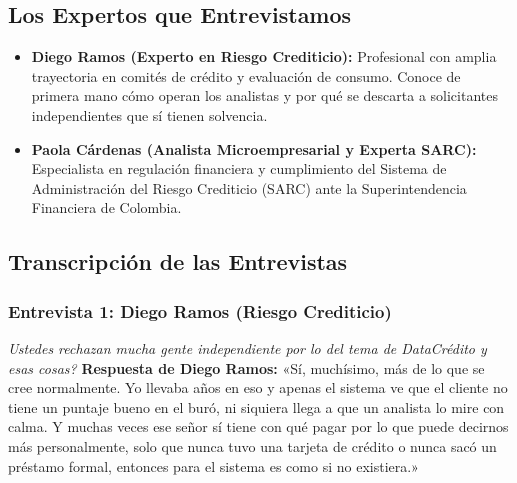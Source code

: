 \documentclass[11pt,a4paper]{article}
\begin{document}
\subsection{Los Expertos que Entrevistamos}
\begin{itemize}[leftmargin=*]
    \item \textbf{Diego Ramos (Experto en Riesgo Crediticio):} Profesional con amplia trayectoria en comit\'es de cr\'edito y evaluaci\'on de consumo. Conoce de primera mano c\'omo operan los analistas y por qu\'e se descarta a solicitantes independientes que s\'i tienen solvencia.
    \item \textbf{Paola C\'ardenas (Analista Microempresarial y Experta SARC):} Especialista en regulaci\'on financiera y cumplimiento del Sistema de Administraci\'on del Riesgo Crediticio (SARC) ante la Superintendencia Financiera de Colombia.
\end{itemize}

\subsection{Transcripci\'on de las Entrevistas}

\subsubsection{Entrevista 1: Diego Ramos (Riesgo Crediticio)}

\begin{tcolorbox}[colback=lightgray,colframe=primary,title={\textbf{Pregunta 1: Rechazo de independientes por falta de historial en bur\'o}}]
\textit{\textquestiondown Ustedes rechazan mucha gente independiente por lo del tema de DataCr\'edito y esas cosas?}
\tcblower
\textbf{Respuesta de Diego Ramos:}  
«S\'i, much\'isimo, m\'as de lo que se cree normalmente. Yo llevaba a\~nos en eso y apenas el sistema ve que el cliente no tiene un puntaje bueno en el bur\'o, ni siquiera llega a que un analista lo mire con calma. Y muchas veces ese se\~nor s\'i tiene con qu\'e pagar por lo que puede decirnos m\'as personalmente, solo que nunca tuvo una tarjeta de cr\'edito o nunca sac\'o un pr\'estamo formal, entonces para el sistema es como si no existiera.»
\end{tcolorbox}
\end{document}
